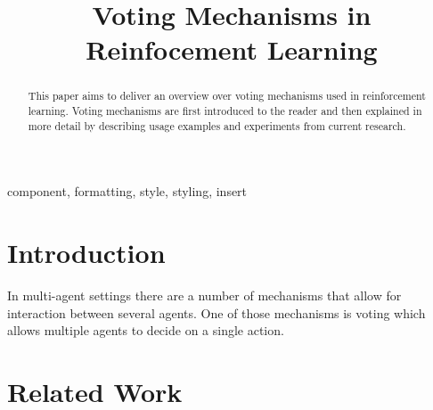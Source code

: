 \documentclass[conference]{IEEEtran}
\begin{document}
\title{Voting Mechanisms in Reinfocement Learning}

\author{
}

\maketitle

\begin{abstract}
This paper aims to deliver an overview over voting mechanisms used in reinforcement learning.
Voting mechanisms are first introduced to the reader and then explained in more detail by
describing usage examples and experiments from current research. 

\end{abstract}

\begin{IEEEkeywords}
component, formatting, style, styling, insert
\end{IEEEkeywords}

\section{Introduction}
In multi-agent settings there are a number of mechanisms that allow for interaction between several agents.
One of those mechanisms is voting which allows multiple agents to decide on a single action. 

\section{Related Work}




\vspace{12pt}
\end{document}
